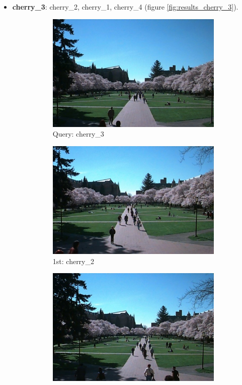 \begin{itemize}
\item \textbf{cherry\_3}: cherry\_2, cherry\_1, cherry\_4 (figure \ref{fig:results_cherry_3}).
\begin{figure}[H]
	\centering
	\begin{subfigure}{0.25\textwidth}
	  \centering
	  \includegraphics[width=0.9\linewidth]{../input/cherry_3.jpg}
	  \caption{Query: cherry\_3}
	\end{subfigure}%
	\begin{subfigure}{0.25\textwidth}
	  \centering
	  \includegraphics[width=0.9\linewidth]{../input/cherry_2.jpg}
	  \caption{1st: cherry\_2}
	\end{subfigure}%
	\begin{subfigure}{0.25\textwidth}
        \centering
        \includegraphics[width=0.9\linewidth]{../input/cherry_1.jpg}

\end{subfigure}
\end{figure}
\end{itemize}
